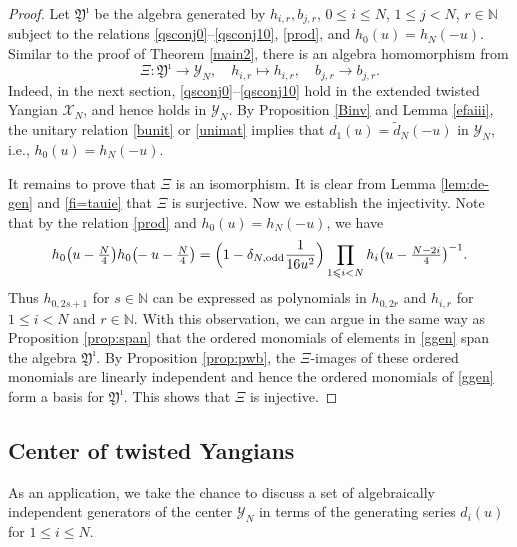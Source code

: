 \documentclass[11pt,reqno]{amsart}
\numberwithin{equation}{section}
\theoremstyle{definition}
\theoremstyle{remark}
\newcommand{\bN}{\mathbb{N}}
\newcommand{\tl}{\tilde}
\newcommand{\lle}{\leqslant}
\newcommand{\Y}{{\mathscr{Y}}}
\newcommand{\scrX}{{\mathscr{X}}}
\begin{document}
\begin{proof} 
Let $\mathfrak Y^\imath$ be the algebra generated by $h_{i,r},b_{j,r}$, $0\lle i\lle N$, $1\lle j<N$, $r\in\bN$ subject to the relations \eqref{qsconj0}--\eqref{qsconj10}, \eqref{prod}, and $h_0(u)=h_{N}(-u)$. Similar to the proof of Theorem \ref{main2}, there is an algebra homomorphism from 
$$
\Xi:\mathfrak Y^\imath\to\Y_N,\quad h_{i,r}\mapsto h_{i,r},\quad b_{j,r}\to b_{j,r}.
$$
Indeed, in the next section, \eqref{qsconj0}--\eqref{qsconj10} hold in the extended twisted Yangian $\scrX_N$, and hence holds in $\Y_N$. By Proposition \ref{Binv} and Lemma \ref{efaiii}, the unitary relation \eqref{bunit} or \eqref{unimat} implies that $d_1(u)=\tl d_N(-u)$ in $\Y_N$, i.e., $h_0(u)=h_{N}(-u)$.

It remains to prove that $\Xi$ is an isomorphism. It is clear from Lemma \ref{lem:de-gen} and \eqref{fi=tauie} that $\Xi$ is surjective. Now we establish the injectivity. Note that by the relation \eqref{prod} and $h_0(u)=h_{N}(-u)$, we have
\[
h_0\big(u-\tfrac{N}4\big)h_0\big(\hskip-0.1cm-u-\tfrac{N}4\big)=\Big(1-\delta_{N,\mathrm{odd}}\frac{1}{16u^2}\Big)
\prod_{1\lle i<N} h_i\big(u-\tfrac{N-2i}{4}\big)^{-1}.
\]
Thus $h_{0,2s+1}$ for $s\in\bN$ can be expressed as polynomials in $h_{0,2r}$ and $h_{i,r}$ for $1\lle i<N$ and $r\in\bN$. With this observation, we can argue in the same way as Proposition \ref{prop:span} that the ordered monomials of elements in \eqref{ggen} span the algebra $\mathfrak Y^\imath$. By Proposition \ref{prop:pwb}, the $\Xi$-images of these ordered monomials are linearly independent and hence the ordered monomials of \eqref{ggen} form a basis for $\mathfrak Y^\imath$. This shows that $\Xi$ is injective.
\end{proof}

\subsection{Center of twisted Yangians}
As an application, we take the chance to discuss a set of algebraically independent generators of the center $\Y_N$ in terms of the generating series $d_i(u)$ for $1\lle i\lle N$. 
\end{document}
